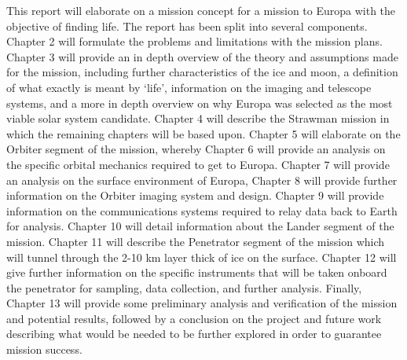This report will elaborate on a mission concept for a mission to Europa with the objective of finding life. The report has been split into several components. Chapter 2 will formulate the problems and limitations with the mission plans. Chapter 3 will provide an in depth overview of the theory and assumptions made for the mission, including further characteristics of the ice and moon, a definition of what exactly is meant by `life', information on the imaging and telescope systems, and a more in depth overview on why Europa was selected as the most viable solar system candidate. Chapter 4 will describe the Strawman mission in which the remaining chapters will be based upon.  Chapter 5 will elaborate on the Orbiter segment of the mission, whereby Chapter 6 will provide an analysis on the specific orbital mechanics required to get to Europa. Chapter 7 will provide an analysis on the surface environment of Europa, Chapter 8 will provide further information on the Orbiter imaging system and design. Chapter 9 will provide information on the communications systems required to relay data back to Earth for analysis. Chapter 10 will detail information about the Lander segment of the mission. Chapter 11 will describe the Penetrator segment of the mission which will tunnel through the 2-10 km layer thick of ice on the surface. Chapter 12 will give further information on the specific instruments that will be taken onboard the penetrator for sampling, data collection, and further analysis. Finally, Chapter 13 will provide some preliminary analysis and verification of the mission and potential results, followed by a conclusion on the project and future work describing what would be needed to be further explored in order to guarantee mission success.